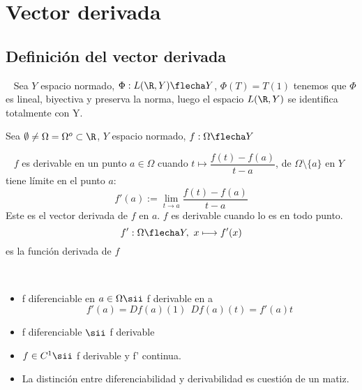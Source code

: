 \chapter{Vector derivada}
\section{Definición del vector derivada}

\begin{definicion} 
    \ \newline
     Sea $Y$ espacio normado, $\Phi:L(\R,Y)\flecha Y$, $\Phi(T) = T(1)$ tenemos que $\Phi$ es lineal, biyectiva y preserva la norma, luego el espacio $L(\R,Y)$ se identifica totalmente con Y.
\end{definicion}

\begin{notacion}
    Sea $\emptyset \neq \Omega = \Omega^o \subset \R$, $Y$ espacio normado, $f:\Omega \flecha Y$
\end{notacion}

\begin{definicion}
    \ \newline
    $f$ es derivable en un punto $a\in \Omega$ cuando $t \longmapsto \dfrac{f(t)-f(a)}{t-a}$, de $\Omega\setminus \{a\}$ en $Y$ tiene límite en el punto $a$:
    $$f'(a) := \lim_{t\to a} \dfrac{f(t)-f(a)}{t-a}$$
    Este es el vector derivada de $f$ en $a$. \newline
    $f$ es derivable cuando lo es en todo punto. 
    $$f':\Omega\flecha Y, \ x \longmapsto f'(x)$$
    es la función derivada de $f$
\end{definicion}

\begin{prop}
    \ \newline
    \begin{itemize}
        \item f diferenciable en $a\in \Omega \sii $ f derivable en a
        $$f'(a) = Df(a)(1) \ \ Df(a)(t)=f'(a)t$$
        \item f diferenciable $\sii$ f derivable
        \item $f\in C^1 \sii $ f derivable y f' continua.
        \item La distinción entre diferenciabilidad y derivabilidad es cuestión de un matiz.
    \end{itemize}
    \ \newline
\end{prop}

